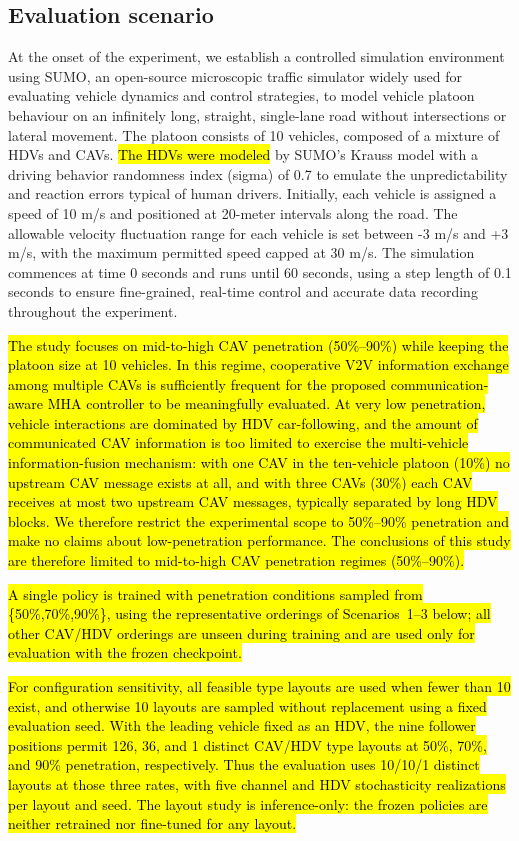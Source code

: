 \documentclass{ieeeaccess}
\begin{document}
\subsection{Evaluation scenario}
At the onset of the experiment, we establish a controlled simulation environment using SUMO, an open-source microscopic traffic simulator widely used for evaluating vehicle dynamics and control strategies, to model vehicle platoon behaviour on an infinitely long, straight, single-lane road without intersections or lateral movement. The platoon consists of 10 vehicles, composed of a mixture of HDVs and CAVs. \hl{The HDVs were modeled} by SUMO's Krauss model with a driving behavior randomness index (sigma) of 0.7 to emulate the unpredictability and reaction errors typical of human drivers.
Initially, each vehicle is assigned a speed of 10 m/s and positioned at 20-meter intervals along the road. The allowable velocity fluctuation range for each vehicle is set between -3 m/s and +3 m/s, with the maximum permitted speed capped at 30 m/s. The simulation commences at time 0 seconds and runs until 60 seconds, using a step length of 0.1 seconds to ensure fine-grained, real-time control and accurate data recording throughout the experiment.

\hl{The study focuses on mid-to-high CAV penetration (50\%--90\%) while keeping the platoon size at 10 vehicles. In this regime, cooperative V2V information exchange among multiple CAVs is sufficiently frequent for the proposed communication-aware MHA controller to be meaningfully evaluated. At very low penetration, vehicle interactions are dominated by HDV car-following, and the amount of communicated CAV information is too limited to exercise the multi-vehicle information-fusion mechanism: with one CAV in the ten-vehicle platoon (10\%) no upstream CAV message exists at all, and with three CAVs (30\%) each CAV receives at most two upstream CAV messages, typically separated by long HDV blocks. We therefore restrict the experimental scope to 50\%--90\% penetration and make no claims about low-penetration performance. The conclusions of this study are therefore limited to mid-to-high CAV penetration regimes (50\%--90\%).}

\hl{A single policy is trained with penetration conditions sampled from \{50\%,70\%,90\%\}, using the representative orderings of Scenarios~1--3 below; all other CAV/HDV orderings are unseen during training and are used only for evaluation with the frozen checkpoint.}

\hl{For configuration sensitivity, all feasible type layouts are used when fewer than 10 exist, and otherwise 10 layouts are sampled without replacement using a fixed evaluation seed. With the leading vehicle fixed as an HDV, the nine follower positions permit 126, 36, and 1 distinct CAV/HDV type layouts at 50\%, 70\%, and 90\% penetration, respectively. Thus the evaluation uses 10/10/1 distinct layouts at those three rates, with five channel and HDV stochasticity realizations per layout and seed. The layout study is inference-only: the frozen policies are neither retrained nor fine-tuned for any layout.} %
\end{document}
